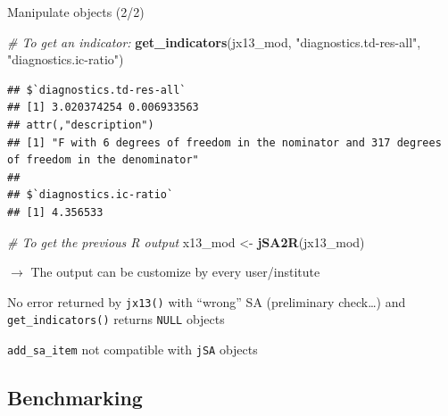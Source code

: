 \documentclass[10pt,xcolor=table,color={dvipsnames,usenames},ignorenonframetext,usepdftitle=false,french]{beamer}
\newenvironment{Shaded}{\begin{snugshade}}{\end{snugshade}}
\newcommand{\CommentTok}[1]{\textcolor[rgb]{0.56,0.35,0.01}{\textit{#1}}}
\newcommand{\KeywordTok}[1]{\textcolor[rgb]{0.13,0.29,0.53}{\textbf{#1}}}
\newcommand{\NormalTok}[1]{#1}
\newcommand{\StringTok}[1]{\textcolor[rgb]{0.31,0.60,0.02}{#1}}
\begin{document}
\begin{frame}[fragile]{Manipulate \faJava{} objects (2/2)}
\protect\hypertarget{manipulate-objects-22}{}

\footnotesize

\begin{Shaded}
\begin{Highlighting}[]
\CommentTok{# To get an indicator:}
\KeywordTok{get_indicators}\NormalTok{(jx13_mod, }\StringTok{"diagnostics.td-res-all"}\NormalTok{, }\StringTok{"diagnostics.ic-ratio"}\NormalTok{)}
\end{Highlighting}
\end{Shaded}

\begin{verbatim}
## $`diagnostics.td-res-all`
## [1] 3.020374254 0.006933563
## attr(,"description")
## [1] "F with 6 degrees of freedom in the nominator and 317 degrees of freedom in the denominator"
## 
## $`diagnostics.ic-ratio`
## [1] 4.356533
\end{verbatim}

\begin{Shaded}
\begin{Highlighting}[]
\CommentTok{# To get the previous R output}
\NormalTok{x13_mod <-}\StringTok{ }\KeywordTok{jSA2R}\NormalTok{(jx13_mod)}
\end{Highlighting}
\end{Shaded}

\(\rightarrow\) The output can be customize by every user/institute

\medskip

\bctakecare No error returned by \texttt{jx13()} with ``wrong'' SA
(preliminary check\ldots{}) and \texttt{get\_indicators()} returns
\texttt{NULL} objects

\medskip

\bcinfo \texttt{add\_sa\_item} not compatible with \texttt{jSA} objects

\end{frame}

\hypertarget{benchmarking}{%
\subsection{Benchmarking}\label{benchmarking}}
\end{document}
